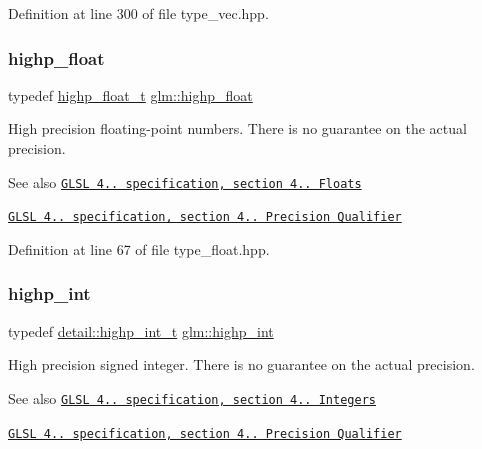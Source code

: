 Definition at line 300 of file type\+\_\+vec.\+hpp.

\mbox{\label{group__core__precision_ga3d443a093adc053638ed7f81c5bfe300}} 
\subsubsection{\texorpdfstring{highp\+\_\+float}{highp\_float}}
{\footnotesize\ttfamily typedef \hyperlink{namespaceglm_af6f4e45ae06ae3f979dd30cafe7d07c6}{highp\+\_\+float\+\_\+t} \hyperlink{group__core__precision_ga3d443a093adc053638ed7f81c5bfe300}{glm\+::highp\+\_\+float}}

High precision floating-\/point numbers. There is no guarantee on the actual precision.

\begin{DoxySeeAlso}{See also}
\href{http://www.opengl.org/registry/doc/GLSLangSpec.4.20.8.pdf}{\tt G\+L\+SL 4.. specification, section 4.. Floats} 

\href{http://www.opengl.org/registry/doc/GLSLangSpec.4.20.8.pdf}{\tt G\+L\+SL 4.. specification, section 4.. Precision Qualifier} 
\end{DoxySeeAlso}


Definition at line 67 of file type\+\_\+float.\+hpp.

\mbox{\label{group__core__precision_gaafed5240eb0a43328cb75faf5fb0a8c2}} 
\subsubsection{\texorpdfstring{highp\+\_\+int}{highp\_int}}
{\footnotesize\ttfamily typedef \hyperlink{namespaceglm_1_1detail_a74c48e9deafcc33db998a4ee62da8d6e}{detail\+::highp\+\_\+int\+\_\+t} \hyperlink{group__core__precision_gaafed5240eb0a43328cb75faf5fb0a8c2}{glm\+::highp\+\_\+int}}

High precision signed integer. There is no guarantee on the actual precision.

\begin{DoxySeeAlso}{See also}
\href{http://www.opengl.org/registry/doc/GLSLangSpec.4.20.8.pdf}{\tt G\+L\+SL 4.. specification, section 4.. Integers} 

\href{http://www.opengl.org/registry/doc/GLSLangSpec.4.20.8.pdf}{\tt G\+L\+SL 4.. specification, section 4.. Precision Qualifier} 
\end{DoxySeeAlso}


